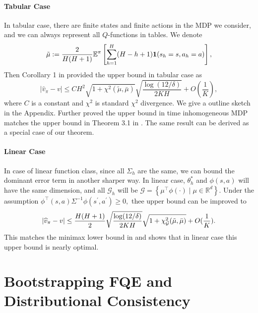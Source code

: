 \documentclass{article}
\numberwithin{equation}{section}
\theoremstyle{plain}
\theoremstyle{definition}
\theoremstyle{remark}
\begin{document}
\paragraph{Tabular Case} In tabular case, there are finite states and finite actions in the MDP we consider, and we can always represent all $Q$-functions in tables. We denote
\begin{equation}\label{definition_tilde_mu}
    \Tilde{\mu} := \frac{2}{H(H+1)} \mathbb{E}^{\pi} \left[\sum_{h=1}^H (H-h+1)\textbf{1}(s_h = s,a_h = a)\right],
\end{equation}
Then Corollary 1 in \citep{duan2020minimax} provided the upper bound in tabular case as 
\begin{equation*}
    \left|\widehat{v}_{\pi} - v\right|
    \leq C H^2 \sqrt{1 + \chi^2(\tilde{\mu},\bar{\mu})} \sqrt{\frac{\log (12 / \delta)}{2 K H}} + O(\frac{1}{K}),
\end{equation*}
where $C$ is a constant and $\chi^2$ is standard $\chi^2$ divergence. We give a outline sketch in the Appendix. Further \citep{duan2020minimax} proved the upper bound in time inhomogeneous MDP matches the upper bound in Theorem 3.1 in \citep{yin2020asymptotically}. The same result can be derived as a special case of our theorem. 


\paragraph{Linear Case} 
In case of linear function class, since all $\Sigma_h$ are the same, we can bound the dominant error term in another sharper way. In linear case, $\theta_h^*$ and $\phi(s,a)$ will have the same dimension, and all $\mathcal{G}_h$ will be $\mathcal{G} = \left\{\mu^{\top}\phi(\cdot) \mid \mu \in \mathbb{R}^d\right\}.$ Under the assumption $\phi^{\top}(s,a)\Sigma^{-1}\phi(s^{\prime},a^{\prime}) \geq 0,$ thee upper bound can be improved to
\begin{equation*}
    \left|\widehat{v}_{\pi} - v\right|
    \leq \frac{H(H+1)}{2} \sqrt{\frac{\log (12 / \delta)}{2 K H}} \sqrt{1 + \chi^2_{\mathcal{G}}(\Tilde{\mu},\bar{\mu})} + O(\frac{1}{K}).
\end{equation*}
This matches the minimax lower bound in \citep{duan2020minimax} and shows that in linear case this upper bound is nearly optimal.

\section{Bootstrapping FQE and Distributional Consistency}
\end{document}
